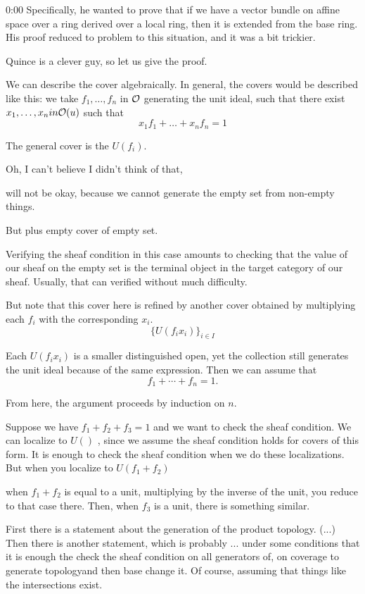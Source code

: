 \begin{unfinished}{0:00}
\gabber Specifically, he wanted to prove that if we have a vector bundle on affine space over a ring derived over a local ring, then it is extended from the base ring. His proof reduced to problem to this situation, and it was a bit trickier.

\clausen Quince is a clever guy, so let us give the proof.

We can describe the cover algebraically. In general, the covers would be described like this: we take $f_1, \ldots, f_n$ in $\mathcal O$ generating the unit ideal, such that there exist $x_1, \ldots, x_n in \mathcal O(u)$ such that
\[
x_1 f_1 + \ldots + x_n f_n = 1
\]

The general cover is the $U(f_i)$.

Oh, I can't believe I didn't think of that, 


\gabber will not be okay, because we cannot generate the empty set from non-empty things.

% 
But plus empty cover of empty set. 

Verifying the sheaf condition in this case amounts to checking that the value of our sheaf on the empty set is the terminal object in the target category of our sheaf. Usually, that can verified without much difficulty.

But note that this cover here  is refined by another cover obtained by multiplying each $f_i$ with the corresponding $x_i$. 
\[
\{ U(f_i x_i)  \}_{i \in I}
\]

Each $U(f_i x_i)$ is a smaller distinguished open, yet the collection still generates the unit ideal because of the same expression.
Then we can assume that 
\[
f_1 + \cdots + f_n = 1.
\]

From here, the argument proceeds by induction on $n$.

Suppose we have $f_1 + f_2 + f_3 = 1$ and we want to check the sheaf condition. We can localize to $U()$ , since we assume the sheaf condition holds for covers of this form. It is enough to check the sheaf condition when we do these localizations. But when you localize to $U(f_1 + f_2)$ 

when $f_1 + f_2$ is equal to a unit, multiplying by the inverse of the unit, you reduce to that case there. Then, when $f_3$ is a unit, there is something similar.

\gabber First there is a statement about the generation of the product  topology. (...)
Then there is another statement, which is probably ... under some conditions that it is enough the check the sheaf condition on all generators of, on coverage to generate topologyand then base change it.
Of course, assuming that things like the intersections exist.


\end{unfinished}
